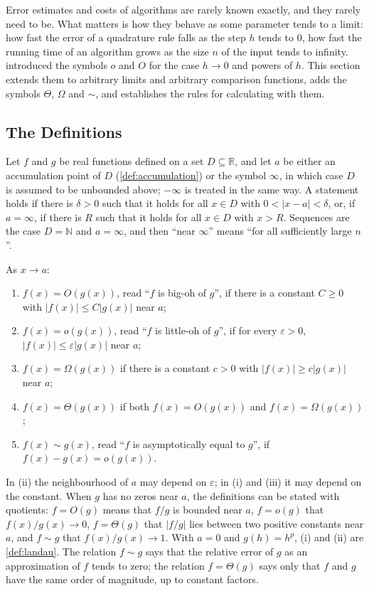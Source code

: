 Error estimates and costs of algorithms are rarely known exactly, and they rarely need to be. What matters is how they behave as some parameter tends to a limit: how fast the error of a quadrature rule falls as the step $h$ tends to $0$, how fast the running time of an algorithm grows as the size $n$ of the input tends to infinity.  introduced the symbols $o$ and $O$ for the case $h\to0$ and powers of $h$. This section extends them to arbitrary limits and arbitrary comparison functions, adds the symbols $\Theta$, $\Omega$ and $\sim$, and establishes the rules for calculating with them.

\subsection{The Definitions}

Let $f$ and $g$ be real functions defined on a set $D\subseteq\mathbb R$, and let $a$ be either an accumulation point of $D$ (\cref{def:accumulation}) or the symbol $\infty$, in which case $D$ is assumed to be unbounded above; $-\infty$ is treated in the same way. A statement holds  if there is $\delta>0$ such that it holds for all $x\in D$ with $0<|x-a|<\delta$, or, if $a=\infty$, if there is $R$ such that it holds for all $x\in D$ with $x>R$. Sequences are the case $D=\mathbb N$ and $a=\infty$, and then ``near $\infty$'' means ``for all sufficiently large $n$''.

\begin{definition}
\label{def:asymptotic-notation}
As $x\to a$:
\begin{enumerate}
\item $f(x)=O(g(x))$, read ``$f$ is big-oh of $g$'', if there is a constant $C\ge0$ with $|f(x)|\le C|g(x)|$ near $a$;
\item $f(x)=o(g(x))$, read ``$f$ is little-oh of $g$'', if for every $\varepsilon>0$, $|f(x)|\le\varepsilon|g(x)|$ near $a$;
\item $f(x)=\Omega(g(x))$ if there is a constant $c>0$ with $|f(x)|\ge c|g(x)|$ near $a$;
\item $f(x)=\Theta(g(x))$ if both $f(x)=O(g(x))$ and $f(x)=\Omega(g(x))$;
\item $f(x)\sim g(x)$, read ``$f$ is asymptotically equal to $g$'', if $f(x)-g(x)=o(g(x))$.
\end{enumerate}
\end{definition}

In (ii) the neighbourhood of $a$ may depend on $\varepsilon$; in (i) and (iii) it may depend on the constant. When $g$ has no zeros near $a$, the definitions can be stated with quotients: $f=O(g)$ means that $f/g$ is bounded near $a$, $f=o(g)$ that $f(x)/g(x)\to0$, $f=\Theta(g)$ that $|f/g|$ lies between two positive constants near $a$, and $f\sim g$ that $f(x)/g(x)\to1$. With $a=0$ and $g(h)=h^p$, (i) and (ii) are \cref{def:landau}. The relation $f\sim g$ says that the relative error of $g$ as an approximation of $f$ tends to zero; the relation $f=\Theta(g)$ says only that $f$ and $g$ have the same order of magnitude, up to constant factors.

